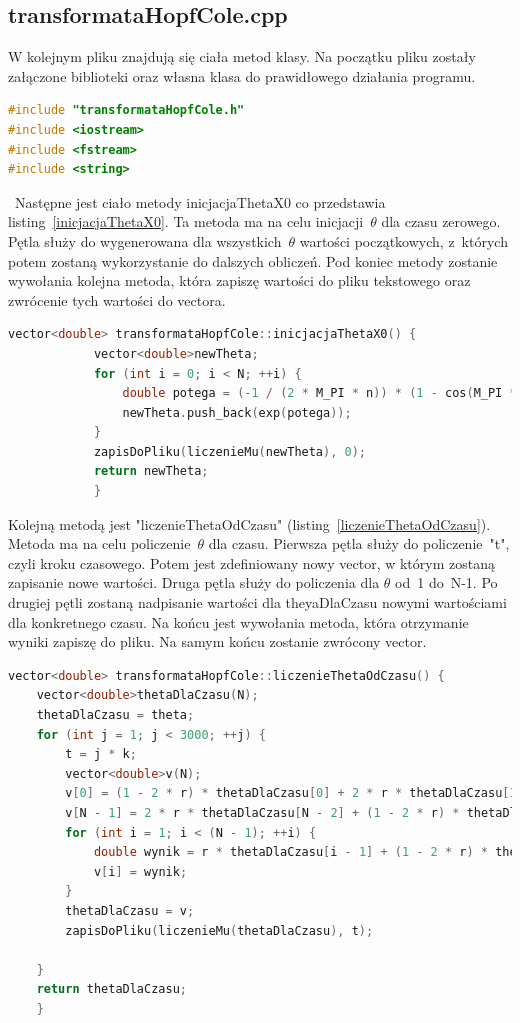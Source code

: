 \documentclass[a4paper,11pt]{article}
\begin{document}
		\subsection{transformataHopfCole.cpp}
		W kolejnym pliku znajdują się ciała metod klasy. Na początku pliku zostały załączone biblioteki oraz własna klasa do prawidłowego działania programu. 
					\begin{lstlisting}[caption={poczadek pliku transformataHopfCole.cpp},label={poczadek.cpp}, language=C++]
#include "transformataHopfCole.h"
#include <iostream>
#include <fstream>
#include <string>\end{lstlisting}
	\	Następne jest ciało metody inicjacjaThetaX0 co przedstawia listing~\ref{inicjacjaThetaX0}. Ta metoda ma na celu inicjacji~$\theta$ dla czasu zerowego. Pętla służy do wygenerowana dla wszystkich~$\theta$ wartości początkowych, z~których potem zostaną wykorzystanie do dalszych obliczeń. Pod koniec metody zostanie wywołania kolejna metoda, która zapiszę wartości do pliku tekstowego oraz zwrócenie tych wartości do vectora.
						\begin{lstlisting}[caption={ciało metody inicjacjaThetaX0},label={inicjacjaThetaX0}, language=C++]
		vector<double> transformataHopfCole::inicjacjaThetaX0() {
			vector<double>newTheta;
			for (int i = 0; i < N; ++i) {
				double potega = (-1 / (2 * M_PI * n)) * (1 - cos(M_PI * (i * h)));
				newTheta.push_back(exp(potega));
			}
			zapisDoPliku(liczenieMu(newTheta), 0);
			return newTheta;
			}\end{lstlisting}
		Kolejną metodą jest "liczenieThetaOdCzasu" (listing~\ref{liczenieThetaOdCzasu}). Metoda ma na celu policzenie~$\theta$ dla czasu. Pierwsza pętla służy do policzenie~"t", czyli kroku czasowego. Potem jest zdefiniowany nowy vector, w którym zostaną zapisanie nowe wartości. Druga pętla służy do policzenia dla $\theta$ od~1 do~N-1. Po drugiej pętli zostaną nadpisanie wartości dla theyaDlaCzasu nowymi wartościami dla konkretnego czasu. Na końcu jest wywołania metoda, która otrzymanie wyniki zapiszę do pliku. Na samym końcu zostanie zwrócony vector.   
								\begin{lstlisting}[caption={ciało metody liczenieThetaOdCzasu},label={liczenieThetaOdCzasu}, language=C++]
vector<double> transformataHopfCole::liczenieThetaOdCzasu() {
	vector<double>thetaDlaCzasu(N);
	thetaDlaCzasu = theta;
	for (int j = 1; j < 3000; ++j) {
		t = j * k;
		vector<double>v(N);
		v[0] = (1 - 2 * r) * thetaDlaCzasu[0] + 2 * r * thetaDlaCzasu[1]; //warunki brzegowe  
		v[N - 1] = 2 * r * thetaDlaCzasu[N - 2] + (1 - 2 * r) * thetaDlaCzasu[N - 1];
		for (int i = 1; i < (N - 1); ++i) {
			double wynik = r * thetaDlaCzasu[i - 1] + (1 - 2 * r) * thetaDlaCzasu[i] + r * thetaDlaCzasu[i + 1];
			v[i] = wynik;
		}
		thetaDlaCzasu = v;
		zapisDoPliku(liczenieMu(thetaDlaCzasu), t);
		
	}
	return thetaDlaCzasu;
	}\end{lstlisting}
\end{document}
